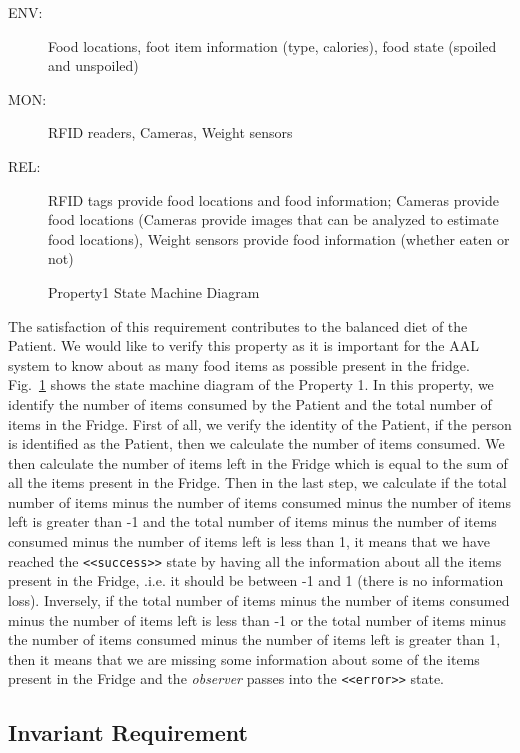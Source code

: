\documentclass[a4paper,twoside]{article}
\begin{document}
\begin{description}
\item[ENV:] Food locations, foot item information (type, calories), food state (spoiled and unspoiled)
\item[MON:] RFID readers, Cameras, Weight sensors
\item[REL:] RFID tags provide food locations and food information; Cameras provide food locations (Cameras provide images that can be analyzed to estimate food locations), Weight sensors provide food information (whether eaten or not)
\end{description}

\begin{figure}[!h]
  \centering
  {}
  \caption{Property1 State Machine Diagram}
  \label{fig:property1stm}
 \end{figure}
 
The satisfaction of this requirement contributes to the balanced diet of the Patient. We would like to verify this property as it is important for the AAL system to know about as many food items as possible present in the fridge. Fig.~\ref{fig:property1stm} shows the state machine diagram of the Property 1. In this property, we identify the number of items consumed by the Patient and the total number of items in the Fridge. First of all, we verify the identity of the Patient, if the person is identified as the Patient, then we calculate the number of items consumed. We then calculate the number of items left in the Fridge which is equal to the sum of all the items present in the Fridge. Then in the last step, we calculate if the total number of items minus the number of items consumed minus the number of items left is greater than -1 and the total number of items minus the number of items consumed minus the number of items left is less than 1, it means that we have reached the \texttt{<<success>>} state by having all the information about all the items present in the Fridge, .i.e. it should be between -1 and 1 (there is no information loss). Inversely, if the total number of items minus the number of items consumed minus the number of items left is less than -1 or the total number of items minus the number of items consumed minus the number of items left is greater than 1, then it means that we are missing some information about some of the items present in the Fridge and the \textit{observer} passes into the \texttt{<<error>>} state.

\subsection{Invariant Requirement}
\end{document}
